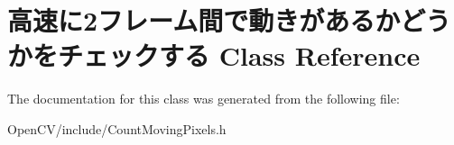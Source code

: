 \hypertarget{class_xE9_xAB_x98_xE9_x80_x9F_xE3_x81_xAB2_xE3_x83_x95_xE3_x83_xAC_xE3_x83_xBC_xE3_x83_xA0_xE9_xe53c8fde8d63a4cabd051bddcffbadf5}{}\section{高速に2フレーム間で動きがあるかどうかをチェックする Class Reference}
\label{class_xE9_xAB_x98_xE9_x80_x9F_xE3_x81_xAB2_xE3_x83_x95_xE3_x83_xAC_xE3_x83_xBC_xE3_x83_xA0_xE9_xe53c8fde8d63a4cabd051bddcffbadf5}


The documentation for this class was generated from the following file\+:\begin{DoxyCompactItemize}
\item 
Open\+C\+V/include/Count\+Moving\+Pixels.\+h\end{DoxyCompactItemize}
